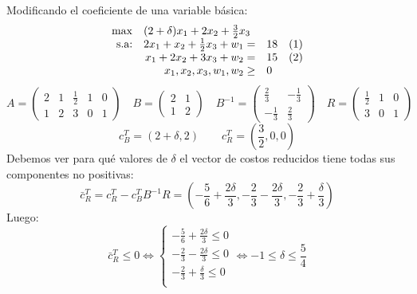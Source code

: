 \documentclass[10pt, aspectratio=169]{beamer}
\begin{document}
\begin{frame}{}
    \small
    Modificando el coeficiente de una variable básica:
        $$
    \begin{array}{rrlc}
    \max & \multicolumn{2}{l}{(2+\delta)x_1+2x_2+\frac{3}{2}x_3}\\
    \text{s.a:}& 2x_1+x_2+\frac{1}{2}x_3 + w_1 = & 18 & (1)\\
     & x_1+2x_2+3x_3 + w_2 = & 15 & (2)\\
     & x_1, x_2, x_3, w_1, w_2\geq & 0 \\
    \end{array}
    $$
        \[A=
    \left(\begin{matrix} 
    2 & 1 & \frac{1}{2} & 1 & 0 \\
    1 & 2 & 3 & 0 & 1
    \end{matrix}\right)
    \quad 
    B=\left(
    \begin{matrix}
    2 & 1 \\
    1 & 2
    \end{matrix}
    \right)
    \quad
        B^{-1}=\left(
    \begin{matrix}
    \frac{2}{3} & -\frac{1}{3} \\
    -\frac{1}{3} & \frac{2}{3}
    \end{matrix}
    \right)
    \quad
    R=\left(
    \begin{matrix}
    \frac{1}{2} & 1 & 0 \\
    3 & 0 & 1
    \end{matrix}
    \right)
    \]
    \[ c_B^T=(2+\delta,2) \qquad c_R^T=(\frac{3}{2},0,0)
    \]
    Debemos ver para qué valores de $\delta$ el vector de costos reducidos tiene todas sus componentes no positivas:
    \[\bar{c}_{R}^T = c_{R}^T - c_B^TB^{-1}R = \left(-\frac{5}{6}+\frac{2\delta}{3}, -\frac{2}{3}-\frac{2\delta}{3}, -\frac{2}{3}+\frac{\delta}{3}\right)  \]
    Luego:
    \[\bar{c}_{R}^T \leq 0 \Leftrightarrow 
    \begin{cases}
            -\frac{5}{6}+\frac{2\delta}{3} \leq 0  \\
        -\frac{2}{3}-\frac{2\delta}{3} \leq 0\\
        -\frac{2}{3}+\frac{\delta}{3} \leq 0 \\
    \end{cases}
    \Leftrightarrow
    -1\leq\delta\leq \frac{5}{4}
    \]
\end{frame}
\end{document}
